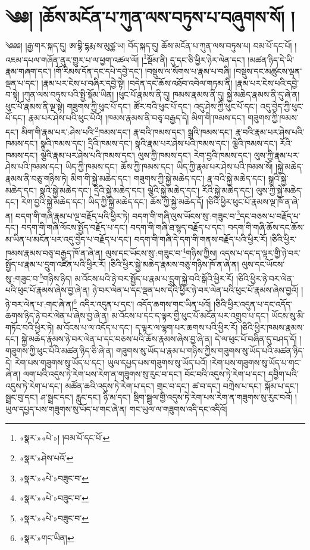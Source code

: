 \chapter{༄༅། །ཆོས་མངོན་པ་ཀུན་ལས་བཏུས་པ་བཞུགས་སོ། །}༄༅༅། །རྒྱ་གར་སྐད་དུ། ཨ་བྷི་དྷརྨ་ས་མུཙྪ་ཡ། བོད་སྐད་དུ། ཆོས་མངོན་པ་ཀུན་ལས་བཏུས་པ། བམ་པོ་དང་པོ། །འཇམ་དཔལ་གཞོན་ནུར་གྱུར་པ་ལ་ཕྱག་འཚལ་ལོ། །\footnote{«སྣར་»«པེ་»། །བམ་པོ་དང་པོ་}སྡོམ་ནི། དུ་དང་ཅི་ཕྱིར་ཉེར་ལེན་དང་། །མཚན་ཉིད་དེ་ཡི་རྣམ་གཞག་དང་། །གོ་རིམས་དོན་དང་དཔེ་དབྱེ་དང་། །བསྡུས་ལ་སོགས་པ་རྣམ་པ་བཞི། །བསྡུས་དང་མཚུངས་ལྡན་ལྡན་པ་དང་། །རྣམ་པར་ངེས་པ་བཞིར་དབྱེ་སྟེ། །བདེན་དང་ཆོས་འཐོབ་འབེལ་གཏམ་ནི། །རྣམ་པར་ངེས་པའི་དབྱེ་བ་སྟེ། །ཀུན་ལས་བཏུས་པའི་སྤྱི་སྡོམ་ཡིན། །ཕུང་པོ་རྣམས་ནི་དུ། ཁམས་རྣམས་ནི་དུ། སྐྱེ་མཆེད་རྣམས་ནི་དུ་ཞེ་ན། ཕུང་པོ་རྣམས་ནི་ལྔ་སྟེ། གཟུགས་ཀྱི་ཕུང་པོ་དང་། ཚོར་བའི་ཕུང་པོ་དང་། འདུ་ཤེས་ཀྱི་ཕུང་པོ་དང་། འདུ་བྱེད་ཀྱི་ཕུང་པོ་དང་། རྣམ་པར་ཤེས་པའི་ཕུང་པོའོ། །ཁམས་རྣམས་ནི་བཅྭ་བརྒྱད་དེ། མིག་གི་ཁམས་དང་། གཟུགས་ཀྱི་ཁམས་དང་། མིག་གི་རྣམ་པར་:ཤེས་པའི་\footnote{«སྣར་»ཤེས་པའོ་}ཁམས་དང་། རྣ་བའི་ཁམས་དང་། སྒྲའི་ཁམས་དང་། རྣ་བའི་རྣམ་པར་ཤེས་པའི་ཁམས་དང་། སྣའི་ཁམས་དང་། དྲིའི་ཁམས་དང་། སྣའི་རྣམ་པར་ཤེས་པའི་ཁམས་དང་། ལྕེའི་ཁམས་དང་། རོའི་ཁམས་དང་། ལྕེའི་རྣམ་པར་ཤེས་པའི་ཁམས་དང་། ལུས་ཀྱི་ཁམས་དང་། རེག་བྱའི་ཁམས་དང་། ལུས་ཀྱི་རྣམ་པར་ཤེས་པའི་ཁམས་དང་། ཡིད་ཀྱི་ཁམས་དང་། ཆོས་ཀྱི་ཁམས་དང་། ཡིད་ཀྱི་རྣམ་པར་ཤེས་པའི་ཁམས་སོ། །སྐྱེ་མཆེད་རྣམས་ནི་བཅུ་གཉིས་ཏེ། མིག་གི་སྐྱེ་མཆེད་དང་། གཟུགས་ཀྱི་སྐྱེ་མཆེད་དང་། རྣ་བའི་སྐྱེ་མཆེད་དང་། སྒྲའི་སྐྱེ་མཆེད་དང་། སྣའི་སྐྱེ་མཆེད་དང་། དྲིའི་སྐྱེ་མཆེད་དང་། ལྕེའི་སྐྱེ་མཆེད་དང་། རོའི་སྐྱེ་མཆེད་དང་། ལུས་ཀྱི་སྐྱེ་མཆེད་དང་། རེག་བྱའི་སྐྱེ་མཆེད་དང་། ཡིད་ཀྱི་སྐྱེ་མཆེད་དང་། ཆོས་ཀྱི་སྐྱེ་མཆེད་དོ། །ཅིའི་ཕྱིར་ཕུང་པོ་རྣམས་ལྔ་ཁོ་ན་ཞེ་ན། བདག་གི་གཞི་རྣམ་པ་ལྔ་བརྗོད་པའི་ཕྱིར་ཏེ། བདག་གི་གཞི་ལུས་ཡོངས་སུ་:གཟུང་བ་\footnote{«སྣར་»«པེ་»བཟུང་བ་}དང་བཅས་པ་བརྗོད་པ་དང་། བདག་གི་གཞི་ལོངས་སྤྱོད་བརྗོད་པ་དང་། བདག་གི་གཞི་ཐ་སྙད་བརྗོད་པ་དང་། བདག་གི་གཞི་ཆོས་དང་ཆོས་མ་ཡིན་པ་མངོན་པར་འདུ་བྱེད་པ་བརྗོད་པ་དང་། བདག་གི་གཞི་དེ་དག་གི་གནས་བརྗོད་པའི་ཕྱིར་རོ། །ཅིའི་ཕྱིར་ཁམས་རྣམས་བཅྭ་བརྒྱད་ཁོ་ན་ཞེ་ན། ལུས་དང་ཡོངས་སུ་:གཟུང་བ་\footnote{«སྣར་»«པེ་»བཟུང་བ་}གཉིས་ཀྱིས། འདས་པ་དང་ད་ལྟར་གྱི་ཉེ་བར་སྤྱོད་པ་རྣམ་པ་དྲུག་འཛིན་པའི་ཕྱིར་རོ། །ཅིའི་ཕྱིར་སྐྱེ་མཆེད་རྣམས་བཅུ་གཉིས་ཁོ་ན་ཞེ་ན། ལུས་དང་ཡོངས་སུ་:གཟུང་བ་\footnote{«སྣར་»«པེ་»བཟུང་བ་}གཉིས་ཉིད། མ་འོངས་པའི་ཉེ་བར་སྤྱོད་པ་རྣམ་པ་དྲུག་སྐྱེ་བའི་སྒོའི་ཕྱིར་རོ། །ཅིའི་ཕྱིར་ཉེ་བར་ལེན་པའི་ཕུང་པོ་རྣམས་ཞེས་བྱ་ཞེ་ན། ཉེ་བར་ལེན་པ་དང་ལྡན་པས་དེའི་ཕྱིར་ཉེ་བར་ལེན་པའི་ཕུང་པོ་རྣམས་ཞེས་བྱའོ། །ཉེ་བར་ལེན་པ་:གང་ཞེ་ན།\footnote{«སྣར་»གང་ཡིན།} འདིར་འདུན་པ་དང་། འདོད་ཆགས་གང་ཡིན་པའོ། །ཅིའི་ཕྱིར་འདུན་པ་དང་འདོད་ཆགས་ཉིད་ཉེ་བར་ལེན་པ་ཞེས་བྱ་ཞེ་ན། མ་འོངས་པ་དང་ད་ལྟར་གྱི་ཕུང་པོ་མངོན་པར་འགྲུབ་པ་དང་། ཡོངས་སུ་མི་གཏོང་བའི་ཕྱིར་ཏེ། མ་འོངས་པ་ལ་འདོད་པ་དང་། ད་ལྟར་ལ་ལྷག་པར་ཆགས་པའི་ཕྱིར་རོ། །ཅིའི་ཕྱིར་ཁམས་རྣམས་དང་། སྐྱེ་མཆེད་རྣམས་ཉེ་བར་ལེན་པ་དང་བཅས་པའི་ཆོས་རྣམས་ཞེས་བྱ་ཞེ་ན། དེ་ལ་ཕུང་པོ་བཞིན་དུ་བཤད་དོ། །གཟུགས་ཀྱི་ཕུང་པོའི་མཚན་ཉིད་ཅི་ཞེ་ན། གཟུགས་སུ་ཡོད་པ་རྣམ་པ་གཉིས་ཀྱིས་གཟུགས་སུ་ཡོད་པའི་མཚན་ཉིད་དེ། རེག་པས་གཟུགས་སུ་ཡོད་པ་དང་། ཡུལ་དཔྱད་པས་གཟུགས་སུ་ཡོད་པའོ། །རེག་པས་གཟུགས་སུ་ཡོད་པ་གང་ཞེ་ན། ལག་པའི་འདུས་ཏེ་རེག་པས་རེག་ན་གཟུགས་སུ་རུང་བ་དང་། བོང་བའི་འདུས་ཏེ་རེག་པ་དང་། དབྱིག་པའི་འདུས་ཏེ་རེག་པ་དང་། མཚོན་ཆའི་འདུས་ཏེ་རེག་པ་དང་། གྲང་བ་དང་། ཚ་བ་དང་། བཀྲེས་པ་དང་། སྐོམ་པ་དང་། སྦྲང་བུ་དང་། ཤ་སྦྲང་དང་། རླུང་དང་། ཉི་མ་དང་། སྡིག་སྦྲུལ་གྱི་འདུས་ཏེ་རེག་པས་རེག་ན་གཟུགས་སུ་རུང་བའོ། །ཡུལ་དཔྱད་པས་གཟུགས་སུ་ཡོད་པ་གང་ཞེ་ན། གང་ཡུལ་ལ་གཟུགས་འདི་དང་འདིའོ། 
